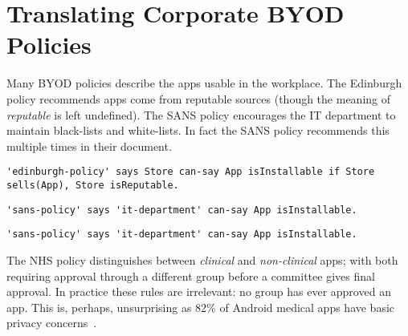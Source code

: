 \documentclass{easychair}
\begin{document}
\section{Translating Corporate BYOD Policies}
\label{sec:translation}

Many BYOD policies describe the apps usable in the workplace.
The Edinburgh policy recommends apps come from reputable sources (though the meaning of \emph{reputable} is left undefined). 
The SANS policy encourages the IT department to maintain black-lists and white-lists.
In fact the SANS policy recommends this multiple times in their document.
\begin{lstlisting}[title={\footnotesize\textbf{Edinburgh}:~\itshape ``Only download applications (‘apps’) or other software from reputable sources.''}]
'edinburgh-policy' says Store can-say App isInstallable if Store sells(App), Store isReputable.
\end{lstlisting}
\begin{lstlisting}[title={\footnotesize\textbf{SANS}:~\itshape ``The IT Department maintains a list of allowed and unauthorised applications and makes them available to users on the intranet.''}]
'sans-policy' says 'it-department' can-say App isInstallable.
\end{lstlisting}
\begin{lstlisting}[title={\footnotesize\textbf{SANS}:~\itshape ``Only approved third party applications can be
installed on handhelds. The approved list can be
obtained by contacting the IT department, or should be
available on the intranet.''}]
'sans-policy' says 'it-department' can-say App isInstallable.
\end{lstlisting}
The NHS policy distinguishes between \emph{clinical} and \emph{non-clinical} apps;
    with both requiring approval through a different group before a committee gives final approval.
In practice these rules are irrelevant: no group has ever approved an app. 
This is, perhaps, unsurprising as 82\% of Android medical apps have basic privacy concerns~\cite{Blenner:2016ja}.
\end{document}
